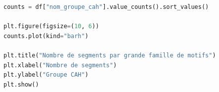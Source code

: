 \begin{lstlisting}[language=Python, caption={Nombre de segments par grande famille de motifs}]
counts = df["nom_groupe_cah"].value_counts().sort_values()

plt.figure(figsize=(10, 6))
counts.plot(kind="barh")

plt.title("Nombre de segments par grande famille de motifs")
plt.xlabel("Nombre de segments")
plt.ylabel("Groupe CAH")
plt.show()
\end{lstlisting}